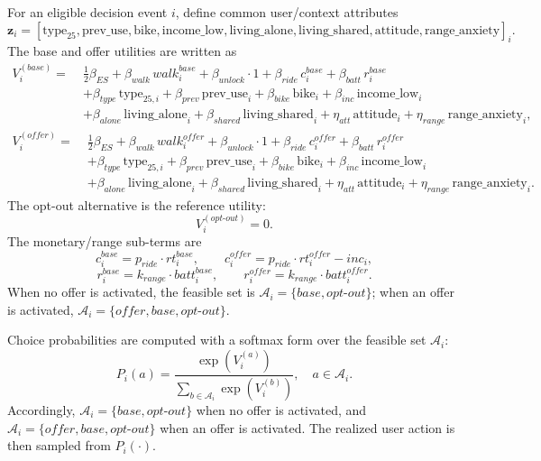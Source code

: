 For an eligible decision event \(i\), define common user/context attributes
\[
\mathbf{z}_i=
\left[
\text{type}_{25},
\text{prev\_use},
\text{bike},
\text{income\_low},
\text{living\_alone},
\text{living\_shared},
\text{attitude},
\text{range\_anxiety}
\right]_i .
\]
The base and offer utilities are written as
\begin{equation}
\begin{aligned}
V_i^{(\textit{base})}
=\;&
\frac{1}{2}\beta_{ES}
+\beta_{walk}\,walk_i^{base}
+\beta_{unlock}\cdot 1
+\beta_{ride}\,c_i^{base}
+\beta_{batt}\,r_i^{base}
\\
&+
\beta_{type}\,\text{type}_{25,i}
+\beta_{prev}\,\text{prev\_use}_i
+\beta_{bike}\,\text{bike}_i
+\beta_{inc}\,\text{income\_low}_i
\\
&+
\beta_{alone}\,\text{living\_alone}_i
+\beta_{shared}\,\text{living\_shared}_i
+\eta_{att}\,\text{attitude}_i
+\eta_{range}\,\text{range\_anxiety}_i,
\end{aligned}
\end{equation}
\begin{equation}
\begin{aligned}
V_i^{(\textit{offer})}
=\;&
\frac{1}{2}\beta_{ES}
+\beta_{walk}\,walk_i^{offer}
+\beta_{unlock}\cdot 1
+\beta_{ride}\,c_i^{offer}
+\beta_{batt}\,r_i^{offer}
\\
&+
\beta_{type}\,\text{type}_{25,i}
+\beta_{prev}\,\text{prev\_use}_i
+\beta_{bike}\,\text{bike}_i
+\beta_{inc}\,\text{income\_low}_i
\\
&+
\beta_{alone}\,\text{living\_alone}_i
+\beta_{shared}\,\text{living\_shared}_i
+\eta_{att}\,\text{attitude}_i
+\eta_{range}\,\text{range\_anxiety}_i.
\end{aligned}
\end{equation}
The opt-out alternative is the reference utility:
\[
V_i^{(\textit{opt-out})}=0.
\]
The monetary/range sub-terms are
\[
c_i^{base}=p_{ride}\cdot rt_i^{base},
\qquad
c_i^{offer}=p_{ride}\cdot rt_i^{offer}-inc_i,
\]
\[
r_i^{base}=k_{range}\cdot batt_i^{base},
\qquad
r_i^{offer}=k_{range}\cdot batt_i^{offer}.
\]
When no offer is activated, the feasible set is \(\mathcal{A}_i=\{\textit{base},\textit{opt-out}\}\); when an offer is activated, \(\mathcal{A}_i=\{\textit{offer},\textit{base},\textit{opt-out}\}\).

Choice probabilities are computed with a softmax form over the feasible set \(\mathcal{A}_i\):
\[
P_i(a)=\frac{\exp\!\left(V_i^{(a)}\right)}{\sum_{b\in \mathcal{A}_i}\exp\!\left(V_i^{(b)}\right)}, \quad a\in\mathcal{A}_i.
\]
Accordingly, \(\mathcal{A}_i=\{\textit{base},\textit{opt-out}\}\) when no offer is activated, and \(\mathcal{A}_i=\{\textit{offer},\textit{base},\textit{opt-out}\}\) when an offer is activated. The realized user action is then sampled from \(P_i(\cdot)\).

